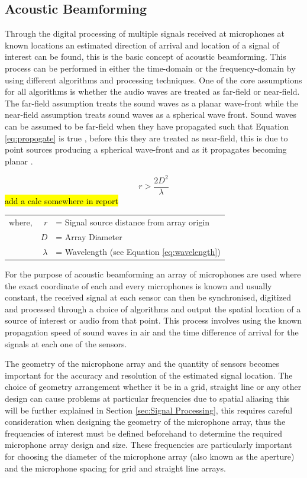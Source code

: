 \documentclass{UoNMCHA}
\numberwithin{equation}{section}
\begin{document}
\subsection{Acoustic Beamforming} \label{sec:Beamforming}
    Through the digital processing of multiple signals received at microphones at known locations an estimated direction of arrival and location of a signal of interest can be found, this is the basic concept of acoustic beamforming. This process can be performed in either the time-domain or the frequency-domain by using different algorithms and processing techniques. One of the core assumptions for all algorithms is whether the audio waves are treated as far-field or near-field. The far-field assumption treats the sound waves as a planar wave-front while the near-field assumption treats sound waves as a spherical wave front. Sound waves can be assumed to be far-field when they have propagated such that Equation \ref{eq:propogate} is true \citep{McC01}, before this they are treated as near-field, this is due to point sources producing a spherical wave-front and as it propagates becoming planar \citep{Yan05}. 
    
    \begin{equation}
        r > \frac{2D^2}{\lambda}
        \label{eq:propogate}
    \end{equation}
    \hl{add a calc somewhere in report}
    \begin{table}[H]
    \centering
        \begin{tabular}{lrl}
            where, & $r$ &= Signal source distance from array origin \\
             & $D$ &= Array Diameter \\
             & $\lambda$ &= Wavelength (see Equation \ref{eq:wavelength})
        \end{tabular}
    \end{table}
    
    For the purpose of acoustic beamforming an array of microphones are used where the exact coordinate of each and every microphones is known and usually constant, the received signal at each sensor can then be synchronised, digitized and processed through a choice of algorithms and output the spatial location of a source of interest or audio from that point. This process involves using the known propagation speed of sound waves in air and the time difference of arrival for the signals at each one of the sensors.
    
    The geometry of the microphone array and the quantity of sensors becomes important for the accuracy and resolution of the estimated signal location. The choice of geometry arrangement whether it be in a grid, straight line or any other design can cause problems at particular frequencies due to spatial aliasing this will be further explained in Section \ref{sec:Signal Processing}, this requires careful consideration when designing the geometry of the microphone array, thus the frequencies of interest must be defined beforehand to determine the required microphone array design and size. These frequencies are particularly important for choosing the diameter of the microphone array (also known as the aperture) and the microphone spacing for grid and straight line arrays.
    
\end{document}

